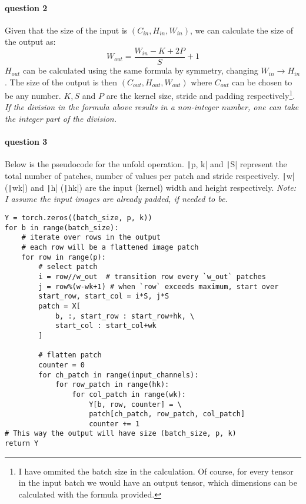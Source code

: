\documentclass{article}
\begin{document}
\paragraph{question 2} Given that the size of the input is \((C_{in}, H_{in}, W_{in})\), we can calculate the size of the output as:
\[
    W_{out} = \frac{W_{in} - K + 2P}{S} + 1
\]
\(H_{out}\) can be calculated using the same formula by symmetry, changing \(W_{in} \rightarrow H_{in}\). The size of the output is then \((C_{out}, H_{out}, W_{out})\) where \(C_{out}\) can be chosen to be any number. \(K, S\) and \(P\) are the kernel size, stride and padding respectively\footnote{I have ommited the batch size in the calculation. Of course, for every tensor in the input batch we would have an output tensor, which dimensions can be calculated with the formula provided.}. \emph{If the division in the formula above results in a non-integer number, one can take the integer part of the division.}

\paragraph{question 3} Below is the pseudocode for the unfold operation. \texttt|p, k| and \texttt|S| represent the total number of patches, number of values per patch and stride respectively. \texttt|w| (\texttt|wk|) and \texttt|h| (\texttt|hk|) are the input (kernel) width and height respectively. \emph{Note: I assume the input images are already padded, if needed to be.}

\begin{verbatim}
Y = torch.zeros((batch_size, p, k))
for b in range(batch_size):
    # iterate over rows in the output
    # each row will be a flattened image patch
    for row in range(p):
        # select patch
        i = row//w_out  # transition row every `w_out` patches
        j = row%(w-wk+1) # when `row` exceeds maximum, start over
        start_row, start_col = i*S, j*S
        patch = X[
            b, :, start_row : start_row+hk, \
            start_col : start_col+wk
        ]

        # flatten patch
        counter = 0
        for ch_patch in range(input_channels):
            for row_patch in range(hk):
                for col_patch in range(wk):
                    Y[b, row, counter] = \
                    patch[ch_patch, row_patch, col_patch]
                    counter += 1
# This way the output will have size (batch_size, p, k)
return Y
\end{verbatim}
\end{document}
